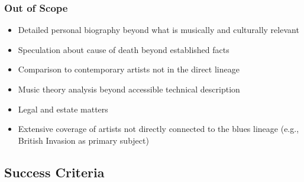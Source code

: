 \documentclass[11pt,letterpaper]{article}
\begin{document}
\subsubsection{Out of Scope}

\begin{itemize}[leftmargin=*]
  \item Detailed personal biography beyond what is musically and culturally relevant
  \item Speculation about cause of death beyond established facts
  \item Comparison to contemporary artists not in the direct lineage
  \item Music theory analysis beyond accessible technical description
  \item Legal and estate matters
  \item Extensive coverage of artists not directly connected to the blues lineage (e.g., British Invasion as primary subject)
\end{itemize}

\subsection{Success Criteria}
\end{document}
